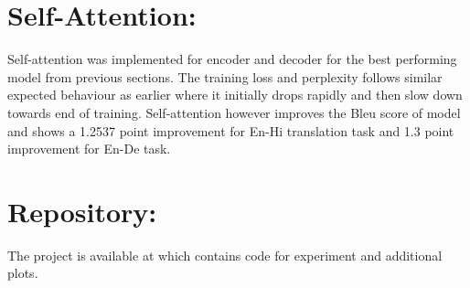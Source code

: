 \documentclass[11pt,a4paper]{article}
\begin{document}


\section{Self-Attention:}
Self-attention was implemented for encoder and decoder for the best performing model from previous sections. The training loss and perplexity follows similar expected behaviour as earlier where it initially drops rapidly and then slow down towards end of training. Self-attention however improves the Bleu score of model and shows a 1.2537 point improvement for En-Hi translation task and 1.3 point improvement for En-De task.

\section*{Repository:}
The project is available at \cite{GitHub} which contains code for experiment and additional plots.



\end{document}
